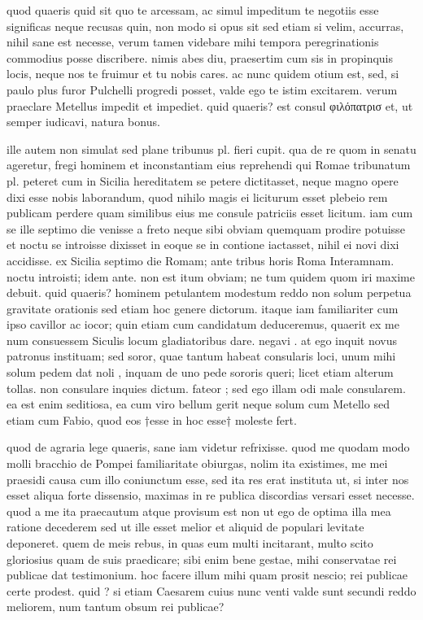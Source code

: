  quod quaeris quid sit quo te arcessam, ac simul impeditum te negotiis esse significas neque recusas quin, non modo si opus sit sed etiam si velim, accurras, nihil sane est necesse, verum tamen videbare mihi tempora peregrinationis commodius posse discribere. nimis abes diu, praesertim cum sis in propinquis locis, neque nos te fruimur et tu nobis cares. ac nunc quidem otium est, sed, si paulo plus furor Pulchelli progredi posset, valde ego te istim excitarem. verum praeclare Metellus impedit et impediet. quid quaeris? est consul φιλόπατρισ et, ut semper iudicavi, natura bonus.

 ille autem non simulat sed plane tribunus pl. fieri cupit. qua de re quom in senatu ageretur, fregi hominem et inconstantiam eius reprehendi qui Romae tribunatum pl. peteret cum in Sicilia hereditatem se petere dictitasset, neque magno opere dixi esse nobis laborandum, quod nihilo magis ei liciturum esset plebeio rem publicam perdere quam similibus eius me consule patriciis esset licitum. iam cum se ille septimo die venisse a freto neque sibi obviam quemquam prodire potuisse et noctu se introisse dixisset in eoque se in contione iactasset, nihil ei novi dixi accidisse. ex Sicilia septimo die Romam; ante tribus horis Roma Interamnam. noctu introisti; idem ante. non est itum obviam; ne tum quidem quom iri maxime debuit. quid quaeris? hominem petulantem modestum reddo non solum perpetua gravitate orationis sed etiam hoc genere dictorum. itaque iam familiariter cum ipso cavillor ac iocor; quin etiam cum candidatum deduceremus, quaerit ex me num consuessem Siculis locum gladiatoribus dare. negavi . at ego inquit novus patronus instituam; sed soror, quae tantum habeat consularis loci, unum mihi solum pedem dat noli , inquam de uno pede sororis queri; licet etiam alterum tollas. non consulare inquies dictum. fateor ; sed ego illam odi male consularem. ea est enim seditiosa, ea cum viro bellum gerit neque solum cum Metello sed etiam cum Fabio, quod eos †esse in hoc esse† moleste fert.

 quod de agraria lege quaeris, sane iam videtur refrixisse. quod me quodam modo molli bracchio de Pompei familiaritate obiurgas, nolim ita existimes, me mei praesidi causa cum illo coniunctum esse, sed ita res erat instituta ut, si inter nos esset aliqua forte dissensio, maximas in re publica discordias versari esset necesse. quod a me ita praecautum atque provisum est non ut ego de optima illa mea ratione decederem sed ut ille esset melior et aliquid de populari levitate deponeret. quem de meis rebus, in quas eum multi incitarant, multo scito gloriosius quam de suis praedicare; sibi enim bene gestae, mihi conservatae rei publicae dat testimonium. hoc facere illum mihi quam prosit nescio; rei publicae certe prodest. quid ? si etiam Caesarem cuius nunc venti valde sunt secundi reddo meliorem, num tantum obsum rei publicae?

